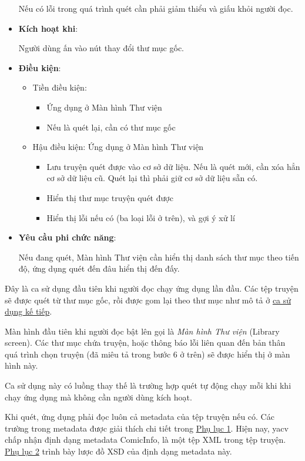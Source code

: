 \documentclass[
]{article}
\begin{document}
\begin{itemize}
  Nếu có lỗi trong quá trình quét cần phải giảm thiểu và giấu khỏi người
  đọc.
\item
  \textbf{Kích hoạt khi}:

  Người dùng ấn vào nút thay đổi thư mục gốc.
\item
  \textbf{Điều kiện}:

  \begin{itemize}
  \item
    Tiền điều kiện:

    \begin{itemize}
        \item
      Ứng dụng ở Màn hình Thư viện
    \item
      Nếu là quét lại, cần có thư mục gốc
    \end{itemize}
  \item
    Hậu điều kiện: Ứng dụng ở Màn hình Thư viện

    \begin{itemize}
        \item
      Lưu truyện quét được vào cơ sở dữ liệu. Nếu là quét mới, cần xóa
      hẳn cơ sở dữ liệu cũ. Quét lại thì phải giữ cơ sở dữ liệu sẵn có.
    \item
      Hiển thị thư mục truyện quét được
    \item
      Hiển thị lỗi nếu có (ba loại lỗi ở trên), và gợi ý xử lí
    \end{itemize}
  \end{itemize}
\item
  \textbf{Yêu cầu phi chức năng}:

  Nếu đang quét, Màn hình Thư viện cần hiển thị danh sách thư mục theo
  tiến độ, ứng dụng quét đến đâu hiển thị đến đấy.
\end{itemize}

Đây là ca sử dụng đầu tiên khi người đọc chạy ứng dụng lần đầu. Các tệp
truyện sẽ được quét từ thư mục gốc, rồi được gom lại theo thư mục như mô
tả ở \protect\hyperlink{P3.3.2-browsing}{ca sử dụng kế tiếp}.

Màn hình đầu tiên khi người đọc bật lên gọi là \emph{Màn hình Thư viện}
(Library screen). Các thư mục chứa truyện, hoặc thông báo lỗi liên quan
đến bản thân quá trình chọn truyện (đã miêu tả trong bước 6 ở trên) sẽ
được hiển thị ở màn hình này.

Ca sử dụng này có luồng thay thế là trường hợp quét tự động chạy mỗi khi
khi chạy ứng dụng mà không cần người dùng kích hoạt.

Khi quét, ứng dụng phải đọc luôn cả metadata của tệp truyện nếu có. Các
trường trong metadata được giải thích chi tiết trong
\protect\hyperlink{P8.1-metadata}{Phụ lục 1}. Hiện nay, yacv chấp nhận
định dạng metadata ComicInfo, là một tệp XML trong tệp truyện.
\protect\hyperlink{P8.2-comicinfo.xsd}{Phụ lục 2} trình bày lược đồ XSD
của định dạng metadata này.
\end{document}

